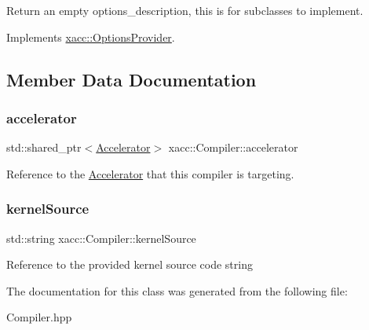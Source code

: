 Return an empty options\+\_\+description, this is for subclasses to implement. 

Implements \hyperlink{a02536_a6d150954f852109bfe2c1ae90222926f}{xacc\+::\+Options\+Provider}.



\subsection{Member Data Documentation}
\mbox{\label{a02448_ad4cbb467fa7e377bac6c054ffcb22b7c}} 
\subsubsection{\texorpdfstring{accelerator}{accelerator}}
{\footnotesize\ttfamily std\+::shared\+\_\+ptr$<$\hyperlink{a02432}{Accelerator}$>$ xacc\+::\+Compiler\+::accelerator\hspace{0.3cm}{\ttfamily [protected]}}

Reference to the \hyperlink{a02432}{Accelerator} that this compiler is targeting. \mbox{\label{a02448_a0ad81c816c09e5113d03cdc02165c453}} 
\subsubsection{\texorpdfstring{kernel\+Source}{kernelSource}}
{\footnotesize\ttfamily std\+::string xacc\+::\+Compiler\+::kernel\+Source\hspace{0.3cm}{\ttfamily [protected]}}

Reference to the provided kernel source code string 

The documentation for this class was generated from the following file\+:\begin{DoxyCompactItemize}
\item 
Compiler.\+hpp\end{DoxyCompactItemize}
